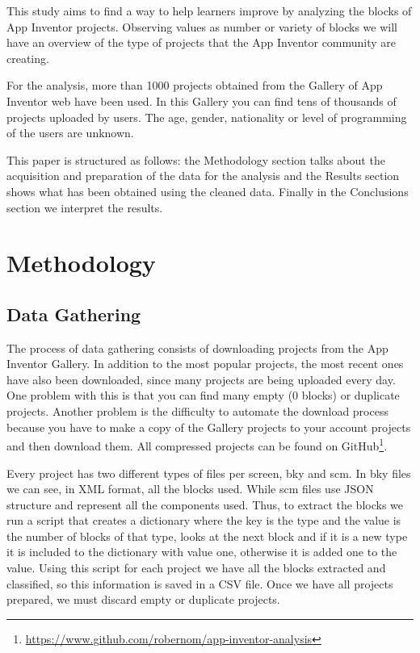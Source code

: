 \documentclass[a4paper]{article}
\begin{document}
This study aims to find a way to help learners improve by analyzing the blocks of App Inventor projects. Observing values as number or variety of blocks we will have an overview of the type of projects that the App Inventor community are creating.

For the analysis, more than 1000 projects obtained from the Gallery of App Inventor web have been used. 
In this Gallery you can find tens of thousands of projects uploaded by users. The age, gender, nationality or level of programming of the users are unknown.

This paper is structured as follows: the Methodology section talks about the acquisition and preparation of the data for the analysis and the Results section shows what has been obtained using the cleaned data. Finally in the Conclusions section we interpret the results.

\section{Methodology}


\subsection{Data Gathering}

The process of data gathering consists of downloading projects from the App Inventor Gallery. In addition to the most popular projects, the most recent ones have also been downloaded, since many projects are being uploaded every day. One problem with this is that you can find many empty (0 blocks) or duplicate projects. Another problem is the difficulty to automate the download process because you have to make a copy of the Gallery projects to your account projects and then download them. All compressed projects can be found on GitHub\footnote{\url{https://www.github.com/robernom/app-inventor-analysis}}.

Every project has two different types of files per screen, bky and scm. In bky files we can see, in XML format, all the blocks used. While scm files use JSON structure and represent all the components used. Thus, to extract the blocks we run a script that creates a dictionary where the key is the type and the value is the number of blocks of that type, looks at the next block and if it is a new type it is included to the dictionary with value one, otherwise it is added one to the value. Using this script for each project we have all the blocks extracted and classified, so this information is saved in a CSV file. Once we have all projects prepared, we must discard empty or duplicate projects.
\end{document}
